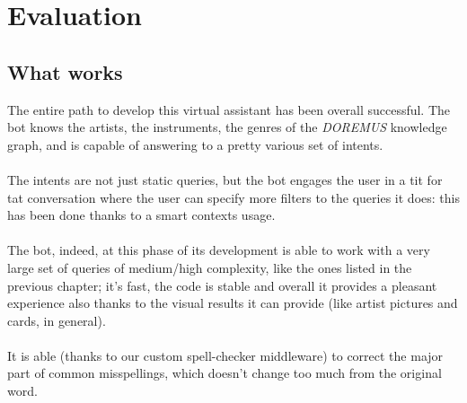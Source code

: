 \chapter{Evaluation}
	
	\section{What works}
	The entire path to develop this virtual assistant has been overall successful. The bot knows the artists, the instruments, the genres of the \textit{DOREMUS} knowledge graph, and is capable of answering to a pretty various set of intents.\\\\
	The intents are not just static queries, but the bot engages the user in a tit for tat conversation where the user can specify more filters to the queries it does: this has been done thanks to a smart contexts usage.\\\\
	The bot, indeed, at this phase of its development is able to work with a very large set of queries of medium/high complexity, like the ones listed in the previous chapter; it's fast, the code is stable and overall it provides a pleasant experience also thanks to the visual results it can provide (like artist pictures and cards, in general).\\\\
	It is able (thanks to our custom spell-checker middleware) to correct the major part of common misspellings, which doesn't change too much from the original word.
	
